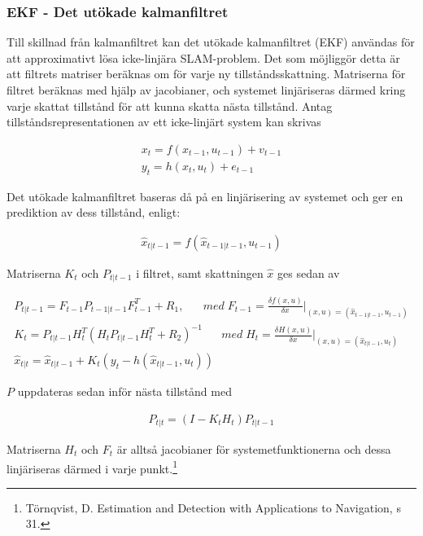 \documentclass[a4paper,12pt,fleqn]{article}
\begin{document}
\subsubsection{EKF - Det utökade kalmanfiltret}

Till skillnad från kalmanfiltret kan det utökade kalmanfiltret (EKF) användas för att approximativt lösa icke-linjära SLAM-problem. Det som möjliggör detta är att filtrets matriser beräknas om för varje ny tillståndsskattning. Matriserna för filtret beräknas med hjälp av jacobianer, och systemet linjäriseras därmed kring varje skattat tillstånd för att kunna skatta nästa tillstånd. Antag tillståndsrepresentationen av ett icke-linjärt system kan skrivas

\begin{gather}
	x_{t} = f(x_{t-1}, u_{t-1}) + v_{t-1} \\
	y_{t} = h(x_{t},u_{t}) + e_{t-1}
\end{gather}

Det utökade kalmanfiltret baseras då på en linjärisering av systemet och ger en prediktion av dess tillstånd, enligt:

\begin{gather}
	\hat{x}_{t|t-1} = f(\hat{x}_{t-1|t-1}, u_{t-1})
\end{gather}

Matriserna $K_t$ och $P_{t|t-1}$ i filtret, samt skattningen $\hat{x}$ ges sedan av

\begin{gather}
	P_{t|t-1} = F_{t-1}P_{t-1|t-1}F^T_{t-1}+R_{1},\;\;\;\;\;\; med \; F_{t-1} = \frac{\delta f(x,u)}{\delta x}\big|_{(x,u) = (\hat{x}_{t-1|t-1}, u_{t-1})} \\
	K_{t} = P_{t|t-1}H_{t}^T(H_{t}P_{t|t-1}H_{t}^T+R_{2})^{-1}\;\;\;\;\;\; med \; H_{t} = \frac{\delta H(x,u)}{\delta x}\big|_{(x,u) = (\hat{x}_{t|t-1}, u_{t})} \\
	\hat{x}_{t|t} = \hat{x}_{t|t-1}+K_{t}(y_{t}-h(\hat{x}_{t|t-1},u_{t}))
\end{gather}

$P$ uppdateras sedan inför nästa tillstånd med

\begin{gather}
	P_{t|t} = (I-K_{t}H_{t})P_{t|t-1}
\end{gather}

Matriserna $H_t$ och $F_t$ är alltså jacobianer för systemetfunktionerna och dessa linjäriseras därmed i varje punkt.\footnote{Törnqvist, D. Estimation and Detection with Applications to Navigation, s 31.}
\end{document}
